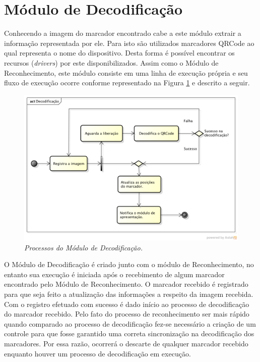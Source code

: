 \section{Módulo de Decodificação}
\label{sec:modulo_decodificacao}

	Conhecendo a imagem do marcador encontrado cabe a este módulo extrair a informação representada por 
	ele. Para isto são utilizados marcadores QRCode ao qual representa o nome do dispositivo. Desta forma é 
	possível encontrar os recursos (\textit{drivers}) por este disponibilizados. Assim como o Módulo de Reconhecimento, 
	este módulo consiste em uma linha de execução própria e seu fluxo de execução ocorre conforme representado 
	na Figura \ref{fig:processo_decode} e descrito a seguir.
	
	\begin{figure}[htb]
		\centering \includegraphics[scale=0.6]{figuras/cap4/processo_decodificacao.png}
		\caption{\textit{Processos do Módulo de Decodificação.}}
		\label{fig:processo_decode} 
	\end{figure}
	
	O Módulo de Decodificação é criado junto com o módulo de Reconhecimento, no entanto sua execução é 
	iniciada após o recebimento de algum marcador encontrado pelo Módulo de Reconhecimento. O marcador 
	recebido é registrado para que seja feito a atualização das informações a respeito da imagem recebida.
	Com o registro efetuado com sucesso é dado início ao processo de decodificação do marcador recebido. 
	Pelo fato do processo de reconhecimento ser mais rápido quando comparado ao processo de decodificação
	fez-se necessário a criação de um controle para que fosse garantido uma correta sincronização na 
	decodificação dos marcadores. Por essa razão, ocorrerá o descarte de qualquer marcador recebido enquanto 
	houver um processo de decodificação em execução. 
	
